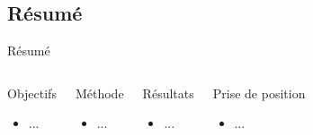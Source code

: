 \subsection{Résumé}
\label{sec:Résumé}

\begin{frame}[t]{Résumé}
    \begin{columns}[T]
        \begin{block}{Objectifs}
            \begin{itemize}
                \item ...
            \end{itemize}
        \end{block}
        \begin{block}{Méthode}
            \begin{itemize}
                \item ...
            \end{itemize}
        \end{block}

        \begin{block}{Résultats}
            \begin{itemize}
                \item ...
            \end{itemize}
        \end{block}
        \begin{block}{Prise de position}
            \begin{itemize}
                \item ...
            \end{itemize}
        \end{block}
    \end{columns}
\end{frame}